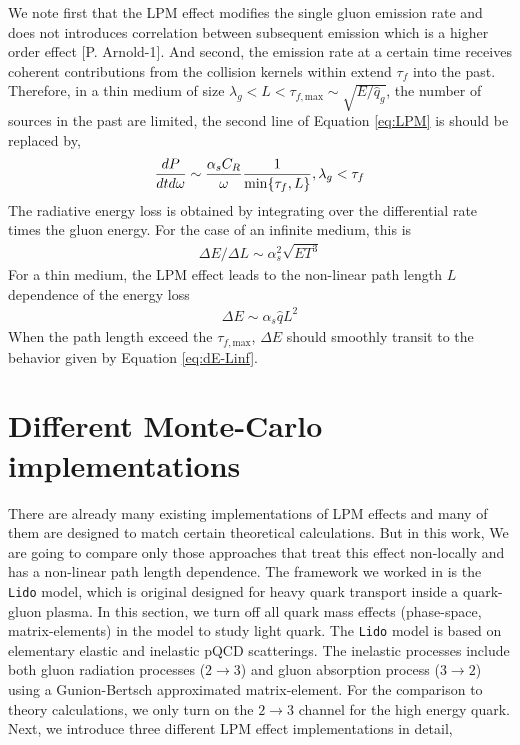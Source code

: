 \documentclass[aps, prc, reprint, amsmath, groupedaddress, nofootinbib]{revtex4-1}
\begin{document}
We note first that the LPM effect modifies the single gluon emission rate and does not introduces correlation between subsequent emission which is a higher order effect [P. Arnold-1].
And second, the emission rate at a certain time receives coherent contributions from the collision kernels within extend $\tau_f$ into the past.
Therefore, in a thin medium of size $\lambda_g < L< \tau_{f,\textrm{max}} \sim \sqrt{E/\hat{q}_g}$, the number of sources in the past are limited, the second line of Equation \ref{eq:LPM} is should be replaced by,
\begin{eqnarray}
\frac{dP}{dt d\omega} \sim 
 \frac{\alpha_s C_R}{\omega} \frac{1}{\min\{\tau_f,L\}}, \hfill \lambda_g < \tau_f
\end{eqnarray}
The radiative energy loss is obtained by integrating over the differential rate times the gluon energy. 
For the case of an infinite medium, this is
\begin{eqnarray}\label{eq:dE-Linf}
\Delta E/\Delta L \sim \alpha_s^2 \sqrt{ET^3}
\end{eqnarray}
For a thin medium, the LPM effect leads to the non-linear path length $L$ dependence of the energy loss
\begin{eqnarray}\label{eq:dE-Lfinite}
\Delta E \sim \alpha_s \hat{q} L^2
\end{eqnarray}
When the path length exceed the $\tau_{f,\textrm{max}}$, $\Delta E$ should smoothly transit to the behavior given by Equation \ref{eq:dE-Linf}.

\section{Different Monte-Carlo implementations}\label{section:MC}
There are already many existing implementations of LPM effects and many of them are designed to match certain theoretical calculations. 
But in this work, We are going to compare only those approaches that treat this effect non-locally and has a non-linear path length dependence.
The framework we worked in is the {\tt Lido} model, which is original designed for heavy quark transport inside a quark-gluon plasma. 
In this section, we turn off all quark mass effects (phase-space, matrix-elements) in the model to study light quark.
The {\tt Lido} model is based on elementary elastic and inelastic pQCD scatterings. 
The inelastic processes include both gluon radiation processes ($2\rightarrow 3$) and gluon absorption process ($3\rightarrow 2$) using a Gunion-Bertsch approximated matrix-element.
For the comparison to theory calculations, we only turn on the $2\rightarrow 3$ channel for the high energy quark.
Next, we introduce three different LPM effect implementations in detail,
\end{document}
